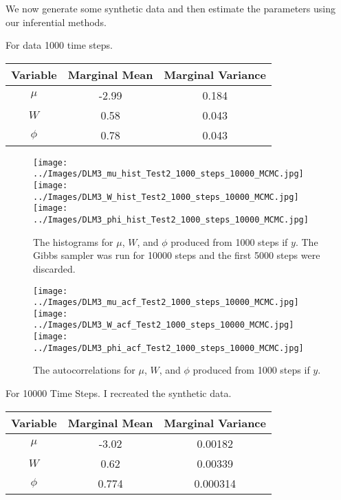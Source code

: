 \documentclass{article}
\begin{document}
We now generate some synthetic data and then estimate the parameters using our inferential methods.

For data 1000 time steps.

\begin{center}
\begin{tabular}{c | c | c}
Variable & Marginal Mean & Marginal Variance \\
\hline
$\mu$ & -2.99 & 0.184 \\
$W$ & 0.58 & 0.043 \\
$\phi$ & 0.78 & 0.043 \\
\end{tabular}
\end{center}

\begin{figure}[!h]
\begin{center}
\texttt{[image: ../Images/DLM3\_mu\_hist\_Test2\_1000\_steps\_10000\_MCMC.jpg]}
\texttt{[image: ../Images/DLM3\_W\_hist\_Test2\_1000\_steps\_10000\_MCMC.jpg]}
\texttt{[image: ../Images/DLM3\_phi\_hist\_Test2\_1000\_steps\_10000\_MCMC.jpg]}
\end{center}
\label{DLM4:histograms}
\caption{The histograms for $\mu$, $W$, and $\phi$ produced from  1000 steps if $y$.  The Gibbs sampler was run for 10000 steps and the first 5000 steps were discarded.}
\end{figure}

\begin{figure}[!h]
\begin{center}
\texttt{[image: ../Images/DLM3\_mu\_acf\_Test2\_1000\_steps\_10000\_MCMC.jpg]}
\texttt{[image: ../Images/DLM3\_W\_acf\_Test2\_1000\_steps\_10000\_MCMC.jpg]}
\texttt{[image: ../Images/DLM3\_phi\_acf\_Test2\_1000\_steps\_10000\_MCMC.jpg]}
\end{center}
\label{DLM4:histograms}
\caption{The autocorrelations for $\mu$, $W$, and $\phi$ produced from  1000 steps if $y$.}
\end{figure}

For 10000 Time Steps.  I recreated the synthetic data.

\begin{center}
\begin{tabular}{c | c | c}
Variable & Marginal Mean & Marginal Variance \\
\hline
$\mu$ & -3.02 & 0.00182 \\
$W$ & 0.62 & 0.00339 \\
$\phi$ & 0.774 & 0.000314 \\
\end{tabular}
\end{center}
\end{document}
